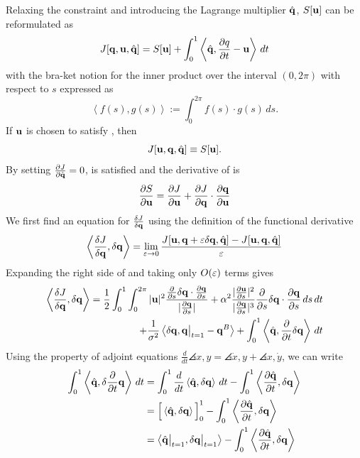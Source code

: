 \documentclass[a4paper, 12pt]{article}
\begin{document}
Relaxing the constraint  and introducing the Lagrange multiplier
$\hat{\mathbf{q}}$, $S[\mathbf{u}]$ can be reformulated as
\begin{equation}
  \label{eq:J}
  J[\mathbf{q}, \mathbf{u}, \hat{\mathbf{q}}] = S[\mathbf{u}] + \int^1_0\left\langle \hat{\mathbf{q}} ,\frac{\partial q}{\partial t} - \mathbf{u}\right\rangle \,dt
\end{equation}
with the bra-ket notion for the inner product over the interval $(0,2\pi)$ with
respect to $s$ expressed as
\begin{equation}
  \left\langle f(s),g(s) \right\rangle := \int^{2\pi}_0 f(s) \cdot g(s)\,ds.
\end{equation}
If $\mathbf{u}$ is chosen to satisfy , then
\begin{equation}
  \label{eq:JeqS}
  J[\mathbf{u}, \mathbf{q}, \hat{\mathbf{q}}] \equiv S[\mathbf{u}].
\end{equation}
By setting $\frac{\partial J}{\partial \hat{\mathbf{q}}} = 0$,  is satisfied and the derivative of  is
\begin{equation}
  \label{eq:dSeqdJ}
  \frac{\partial S}{\partial \mathbf{u}} =  \frac{\partial J}{\partial \mathbf{u}} + \frac{\partial J}{\partial \mathbf{q}}\cdot\frac{\partial \mathbf{q}}{\partial \mathbf{u}}
\end{equation}
We first find an equation for  $\frac{\delta J}{\delta \mathbf{q}}$ using the definition of the functional derivative 
\begin{equation}
  \label{eq:lim_dJdq}
  \left\langle \frac{\delta J}{\delta \mathbf{q}}, \delta \mathbf{q} \right\rangle =
  \lim_{\varepsilon \rightarrow 0} \frac{J[\mathbf{u}, \mathbf{q} + \varepsilon \delta \mathbf{q}, \hat{\mathbf{q}}] - J[\mathbf{u}, \mathbf{q}, \hat{\mathbf{q}}]}{\varepsilon}
\end{equation}
Expanding the right side of  and taking only $O(\varepsilon)$ terms gives
\begin{equation}
  \begin{split}
  \label{eq:dJdq}
  \left\langle \frac{\delta J}{\delta \mathbf{q}}, \delta \mathbf{q} \right\rangle =
  \frac{1}{2}\int^1_0\int^{2\pi}_0 |\mathbf{u}|^2
  \frac{\frac{\partial }{\partial s}\delta \mathbf{q} \cdot \frac{\partial \mathbf{q}}{\partial s}}{|\frac{\partial \mathbf{q}}{\partial s}|}
    + \alpha^2 \frac{|\frac{\partial \mathbf{u}}{\partial s}|^2}{|\frac{\partial \mathbf{q}}{\partial s}|^3} \frac{\partial }{\partial s}\delta \mathbf{q} \cdot \frac{\partial \mathbf{q}}{\partial s} \,ds\,dt  \\
    + \frac{1}{\sigma^2}\left\langle \delta \mathbf{q}, \mathbf{q}\big|_{t=1} - \mathbf{q}^B \right\rangle + \int^1_0\left\langle \hat{\mathbf{q}}, \frac{\partial }{\partial t} \delta \mathbf{q} \right\rangle\,dt
\end{split}
\end{equation}
Using the property of adjoint equations $\frac{d}{dt}\angles{x,y} = \angles{\dot x, y} + \angles{x, \dot y}$, we can write
\begin{equation}
\begin{split}
  \label{eq:adjoint}
  \int^1_0\left\langle \hat{\mathbf{q}}, \delta \frac{\partial }{\partial t} \mathbf{q} \right\rangle\,dt &=  
  \int^1_0 \frac{d}{dt}\left\langle \hat{\mathbf{q}}, \delta \mathbf{q} \right\rangle\,dt 
  - \int^1_0 \left\langle \frac{\partial \hat{\mathbf{q}}}{\partial t},\delta \mathbf{q} \right\rangle\\
  &= \Big[\left\langle \hat{\mathbf{q}}, \delta \mathbf{q} \right\rangle \Big]^1_0 - \int^1_0
  \left\langle \frac{\partial \hat{\mathbf{q}}}{\partial t},\delta \mathbf{q} \right\rangle\\
  &= \left\langle \hat{\mathbf{q}} \big|_{t=1},\delta \mathbf{q}\big|_{t=1} \right\rangle - \int^1_0 \left\langle \frac{\partial \hat{\mathbf{q}}}{\partial t},\delta \mathbf{q} \right\rangle
\end{split}
\end{equation}
\end{document}
